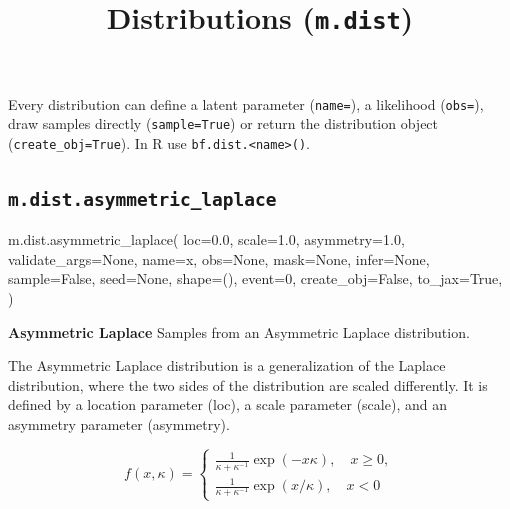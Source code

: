 \documentclass[
  letterpaper,
  DIV=11,
  numbers=noendperiod]{scrartcl}
\title{Distributions (\texttt{m.dist})}
\author{}
\date{}
\newenvironment{Shaded}{\begin{snugshade}}{\end{snugshade}}
\newcommand{\DecValTok}[1]{\textcolor[rgb]{0.68,0.00,0.00}{#1}}
\newcommand{\FloatTok}[1]{\textcolor[rgb]{0.68,0.00,0.00}{#1}}
\newcommand{\NormalTok}[1]{\textcolor[rgb]{0.00,0.23,0.31}{#1}}
\newcommand{\OperatorTok}[1]{\textcolor[rgb]{0.37,0.37,0.37}{#1}}
\newcommand{\StringTok}[1]{\textcolor[rgb]{0.13,0.47,0.30}{#1}}
\newcommand{\VariableTok}[1]{\textcolor[rgb]{0.07,0.07,0.07}{#1}}
\begin{document}
\maketitle


Every distribution can define a latent parameter (\texttt{name=}), a
likelihood (\texttt{obs=}), draw samples directly (\texttt{sample=True})
or return the distribution object (\texttt{create\_obj=True}). In R use
\texttt{bf.dist.\textless{}name\textgreater{}()}.

\subsection{\texorpdfstring{\texttt{m.dist.asymmetric\_laplace}}{m.dist.asymmetric\_laplace}}\label{asymmetric_laplace}

\begin{Shaded}
\begin{Highlighting}[]
\NormalTok{m.dist.asymmetric\_laplace(}
\NormalTok{    loc}\OperatorTok{=}\FloatTok{0.0}\NormalTok{,}
\NormalTok{    scale}\OperatorTok{=}\FloatTok{1.0}\NormalTok{,}
\NormalTok{    asymmetry}\OperatorTok{=}\FloatTok{1.0}\NormalTok{,}
\NormalTok{    validate\_args}\OperatorTok{=}\VariableTok{None}\NormalTok{,}
\NormalTok{    name}\OperatorTok{=}\StringTok{\textquotesingle{}x\textquotesingle{}}\NormalTok{,}
\NormalTok{    obs}\OperatorTok{=}\VariableTok{None}\NormalTok{,}
\NormalTok{    mask}\OperatorTok{=}\VariableTok{None}\NormalTok{,}
\NormalTok{    infer}\OperatorTok{=}\VariableTok{None}\NormalTok{,}
\NormalTok{    sample}\OperatorTok{=}\VariableTok{False}\NormalTok{,}
\NormalTok{    seed}\OperatorTok{=}\VariableTok{None}\NormalTok{,}
\NormalTok{    shape}\OperatorTok{=}\NormalTok{(),}
\NormalTok{    event}\OperatorTok{=}\DecValTok{0}\NormalTok{,}
\NormalTok{    create\_obj}\OperatorTok{=}\VariableTok{False}\NormalTok{,}
\NormalTok{    to\_jax}\OperatorTok{=}\VariableTok{True}\NormalTok{,}
\NormalTok{)}
\end{Highlighting}
\end{Shaded}

\textbf{Asymmetric Laplace} Samples from an Asymmetric Laplace
distribution.

The Asymmetric Laplace distribution is a generalization of the Laplace
distribution, where the two sides of the distribution are scaled
differently. It is defined by a location parameter (loc), a scale
parameter (scale), and an asymmetry parameter (asymmetry).

\[
f(x, \kappa) = \begin{cases} \frac{1}{\kappa+\kappa^{-1}}\exp(-x\kappa),\quad x\ge0, \\ \frac{1}{\kappa+\kappa^{-1}}\exp(x/\kappa),\quad x<0 \end{cases}
\]
\end{document}
